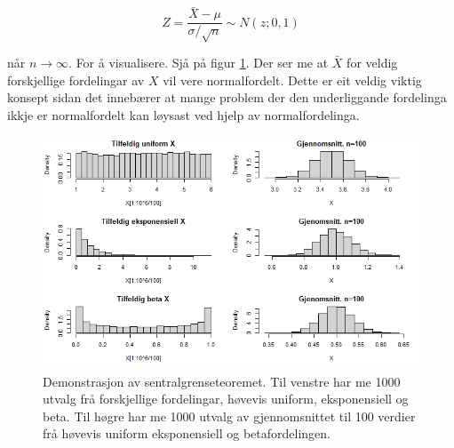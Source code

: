 \begin{equation}
    Z = \frac{\bar{X} - \mu}{\sigma / \sqrt{n}} \sim N(z; 0, 1)
\end{equation}

når $n \rightarrow \infty$. For å visualisere. Sjå på figur \ref{fig:CLT}. Der ser me at $\bar{X}$ for veldig forskjellige fordelingar av $X$ vil vere normalfordelt. Dette er eit veldig viktig konsept sidan det innebærer at mange problem der den underliggande fordelinga ikkje er normalfordelt kan løysast ved hjelp av normalfordelinga.

\begin{figure}[H]
    \centering
    \label{fig:CLT}
    \includegraphics[width=\textwidth]{bilete/CLT.png}
    \caption{Demonstrasjon av sentralgrenseteoremet. Til venstre har me 1000 utvalg frå forskjellige fordelingar, høvevis uniform, eksponensiell og beta. Til høgre har me 1000 utvalg av gjennomsnittet til 100 verdier frå høvevis uniform eksponensiell og betafordelingen.}
\end{figure}